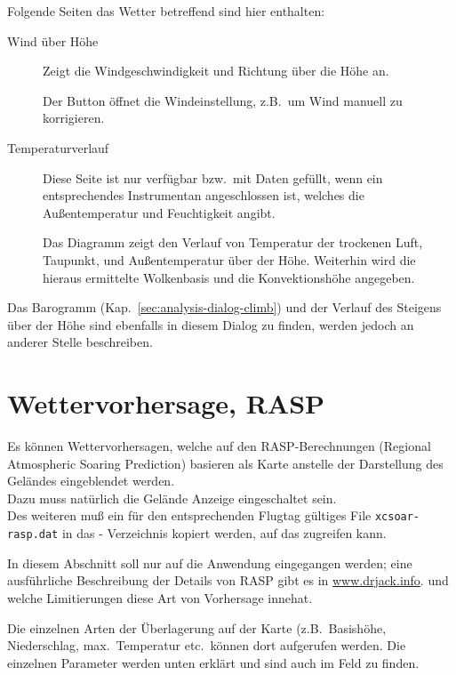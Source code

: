 Folgende Seiten das Wetter betreffend sind hier enthalten:
\begin{description}
\item[Wind über Höhe]
Zeigt die Windgeschwindigkeit und Richtung über die Höhe an.

Der Button  öffnet die Windeinstellung, z.B.\ um Wind manuell zu korrigieren.

\item[Temperaturverlauf]
 Diese Seite ist nur verfügbar bzw.\ mit Daten gefüllt, wenn ein entsprechendes Instrumentan  \xc angeschlossen ist, welches die Außentemperatur und Feuchtigkeit angibt.

Das Diagramm zeigt den Verlauf von Temperatur der trockenen Luft, Taupunkt, und Außentemperatur
über der Höhe. Weiterhin wird die hieraus ermittelte Wolkenbasis und die Konvektionshöhe  angegeben.


\end{description}
Das Barogramm (Kap.~\ref{sec:analysis-dialog-climb}) und der Verlauf des Steigens über der Höhe sind
ebenfalls in diesem Dialog zu finden, werden jedoch an anderer Stelle beschreiben.

\section{Wettervorhersage, RASP}
Es können Wettervorhersagen, welche auf den RASP-Berechnungen (Regional Atmospheric
Soaring Prediction) basieren als Karte anstelle der Darstellung des Geländes eingeblendet werden. \\

Dazu muss natürlich die Gelände Anzeige eingeschaltet sein. \tip{} \\

Des weiteren muß ein für den entsprechenden Flugtag gültiges File \verb"xcsoar-rasp.dat"  in
das \xc - Verzeichnis kopiert werden, auf das  \xc zugreifen kann.

In diesem Abschnitt soll nur auf die Anwendung eingegangen werden; eine ausführliche
Beschreibung der Details von RASP gibt es in  \url{www.drjack.info}.
und welche Limitierungen diese Art von Vorhersage innehat.

Die einzelnen Arten der Überlagerung auf der Karte (z.B.\ Basishöhe, Niederschlag,
max.\ Temperatur etc.\  können dort aufgerufen werden.
Die einzelnen Parameter werden unten erklärt und sind auch im Feld  zu finden.

